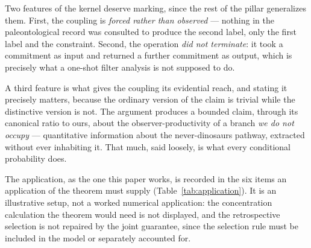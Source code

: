 \documentclass[11pt]{article}
\theoremstyle{definition}
\begin{document}
Two features of the kernel deserve marking, since the rest of the pillar generalizes them. First, the coupling is \emph{forced rather than observed} --- nothing in the paleontological record was consulted to produce the second label, only the first label and the constraint. Second, the operation \emph{did not terminate}: it took a commitment as input and returned a further commitment as output, which is precisely what a one-shot filter analysis is not supposed to do.

A third feature is what gives the coupling its evidential reach, and stating it precisely matters, because the ordinary version of the claim is trivial while the distinctive version is not. The argument produces a bounded claim, through its canonical ratio to ours, about the observer-productivity of a branch \emph{we do not occupy} --- quantitative information about the never-dinosaurs pathway, extracted without ever inhabiting it. That much, said loosely, is what every conditional probability does.






\noindent The application, as the one this paper works, is recorded in the six items an application of the theorem must supply (Table~\ref{tab:application}). It is an illustrative setup, not a worked numerical application: the concentration calculation the theorem would need is not displayed, and the retrospective selection is not repaired by the joint guarantee, since the selection rule must be included in the model or separately accounted for.
\end{document}
